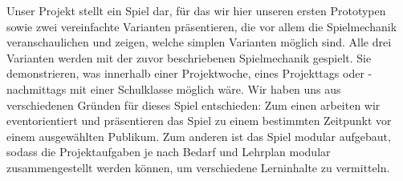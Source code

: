 \markdownRendererDocumentBegin
\markdownRendererSectionBegin
\markdownRendererSectionBegin
{}\markdownRendererInterblockSeparator
{}Unser Projekt stellt ein Spiel dar, für das wir hier unseren ersten Prototypen sowie zwei vereinfachte Varianten präsentieren, die vor allem die Spielmechanik veranschaulichen und zeigen, welche simplen Varianten möglich sind. Alle drei Varianten werden mit der zuvor beschriebenen Spielmechanik gespielt. Sie demonstrieren, was innerhalb einer Projektwoche, eines Projekttags oder -nachmittags mit einer Schulklasse möglich wäre. Wir haben uns aus verschiedenen Gründen für dieses Spiel entschieden: Zum einen arbeiten wir eventorientiert und präsentieren das Spiel zu einem bestimmten Zeitpunkt vor einem ausgewählten Publikum. Zum anderen ist das Spiel modular aufgebaut, sodass die Projektaufgaben je nach Bedarf und Lehrplan modular zusammengestellt werden können, um verschiedene Lerninhalte zu vermitteln.
\markdownRendererSectionEnd 
\markdownRendererSectionEnd \markdownRendererDocumentEnd